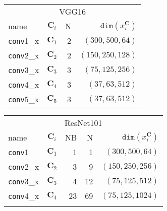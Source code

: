 \documentclass[10pt,twocolumn,letterpaper]{article}
\newcommand{\vv}[1]{{\texttt{#1}}}
\newcommand{\conv}{\vv{conv}}
\begin{document}
\begin{table*}
    \centering
    \footnotesize
    \caption{Base networks architecture details for VGG16, ResNet101 and InceptionResNetv2. Legend: $\mathbf{C}_i$: bottom-up block id, N: number of convolutional filters, NR: number of residual units, NI: number of inception-resnet units, $\texttt{dim}\left(x^\mathbf{C}_i\right)$: Resolution and dimensions of the output feature. Refer to~\cite{VGG,resnet,szegedy2016inception,huang2016speed} for details\vspace{0.05in}}
    \label{tab:base_arch}
        \begin{tabular}{@{}lcrr@{}}
        \toprule
        \multicolumn{4}{c}{VGG16}\\
        \arrayrulecolor{gray}
        \midrule
        \arrayrulecolor{black}
        name & $\mathbf{C}_i$ & N & $\texttt{dim}\left(x^\mathbf{C}_i\right)$\\
        \midrule
        \conv1\_x & $\mathbf{C}_1$ & 2 & $\left(300,500,64\right)$\\
        \conv2\_x & $\mathbf{C}_2$ & 2 & $\left(150,250,128\right)$\\
        \conv3\_x & $\mathbf{C}_3$ & 3 & $\left(75,125,256\right)$\\
        \conv4\_x & $\mathbf{C}_4$ & 3 & $\left(37,63,512\right)$\\
        \conv5\_x & $\mathbf{C}_5$ & 3 & $\left(37,63,512\right)$\\
     \bottomrule
        \end{tabular}
    \quad
    \begin{tabular}{@{}lcrrr@{}}
    \toprule
    \multicolumn{5}{c}{ResNet101}\\
    \arrayrulecolor{gray}
    \midrule
    \arrayrulecolor{black}
    name & $\mathbf{C}_i$ & NB & N & $\texttt{dim}\left(x^\mathbf{C}_i\right)$\\
    \midrule
    \conv1 & $\mathbf{C}_1$ & 1 & 1 & $\left(300,500,64\right)$\\
    \conv2\_x & $\mathbf{C}_2$ & 3 & 9 & $\left(150,250,256\right)$\\
    \conv3\_x & $\mathbf{C}_3$ & 4 & 12 & $\left(75,125,512\right)$\\
    \conv4\_x & $\mathbf{C}_4$ & 23 & 69 & $\left(75,125,1024\right)$\\
         \bottomrule
         \\
    \end{tabular}
    \quad
    \begin{tabular}{@{}llrrr@{}}

\end{tabular}
\end{table*}
\end{document}
